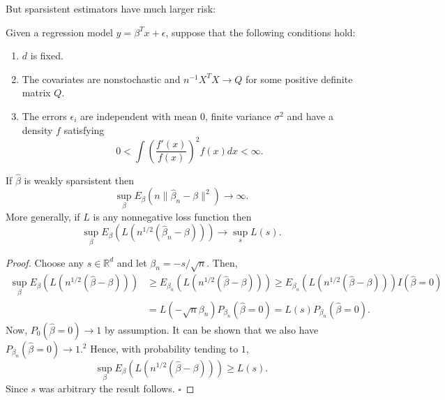   But sparsistent estimators have much larger risk:

  \begin{theorem}
    \label{thm:leeb-and-potscher-2007}
    Given a regression model $y = \beta^T x + \epsilon$, suppose that the following conditions hold:
    \begin{enumerate}
      \item $d$ is fixed.
      
      \item The covariates are nonstochastic and $n^{-1}X^T X \to Q$ for some positive definite matrix $Q$.
      
      \item The errors $\epsilon_i$ are independent with mean $0$, finite variance $\sigma^2$ and have a density $f$ satisfying
      \begin{equation}
        0 < \int \left( \frac{f'(x)}{f(x)} \right)^2 f(x) dx < \infty.
      \end{equation}
    \end{enumerate}
    If $\hat{\beta}$ is weakly sparsistent then
    \begin{equation}
      \sup_{\beta} E_{\beta}(n\|\hat{\beta}_n - \beta\|^2) \to \infty. 
    \end{equation}
    More generally, if $L$ is any nonnegative loss function then
    \begin{equation}
      \sup_{\beta} E_{\beta}(L(n^{1/2}(\hat{\beta}_n - \beta))) \to \sup_s L(s). 
    \end{equation}
  \end{theorem}
  \begin{proof}
    Choose any $s \in \mathbb{R}^d$ and let $\beta_n = -s/\sqrt{n}$. Then,
    \begin{align}
      \sup_{\beta} E_{\beta}(L(n^{1/2}(\hat{\beta} - \beta))) &\geq E_{\beta_n}(L(n^{1/2}(\hat{\beta} - \beta))) \geq E_{\beta_n}(L(n^{1/2}(\hat{\beta} - \beta))) I(\hat{\beta} = 0) \\
      &= L(-\sqrt{n}\beta_n) P_{\beta_n}(\hat{\beta} = 0) = L(s) P_{\beta_n}(\hat{\beta} = 0).
    \end{align}
    Now, $P_0(\hat{\beta} = 0) \to 1$ by assumption. It can be shown that we also have $P_{\beta_n}(\hat{\beta} = 0) \to 1.^2$ Hence, with probability tending to $1$,
    \begin{equation}
      \sup_{\beta} E_{\beta}(L(n^{1/2}(\hat{\beta} - \beta))) \geq L(s).
    \end{equation}
    Since $s$ was arbitrary the result follows. $\square$
  \end{proof}
